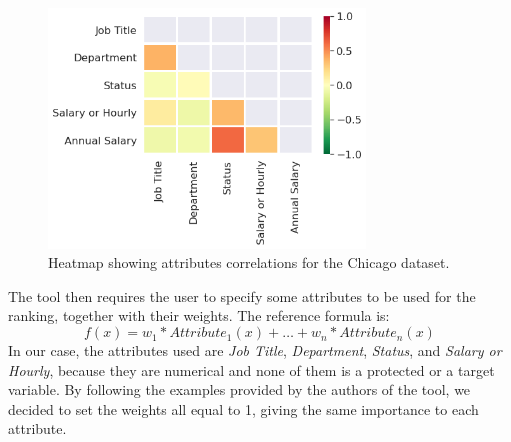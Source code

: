 \begin{figure}[h!]
\centering
\includegraphics[width=0.75\textwidth]{figures/chicago_rankingfacts1.png}
\caption{Heatmap showing attributes correlations for the Chicago dataset.}
\label{fig:chicago_rankingfacts1}
\end{figure}

The tool then requires the user to specify some attributes to be used for the ranking, together with their weights. The reference formula is: \[f(x) = w_1 * \mathit{Attribute}_1(x) + \ldots + w_n * \mathit{Attribute}_n(x)\]
In our case, the attributes used are \textit{Job Title}, \textit{Department}, \textit{Status}, and \textit{Salary or Hourly}, because they are numerical and none of them is a protected or a target variable. By following the examples provided by the authors of the tool, we decided to set the weights all equal to 1, giving the same importance to each attribute.


